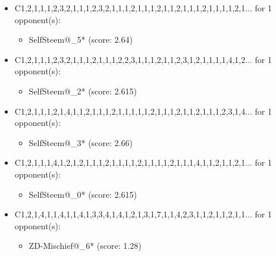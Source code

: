 \begin{appendices}
\begin{itemize}
    \item C1,2,1,1,1,2,3,2,1,1,1,2,3,2,1,1,1,2,1,1,1,2,1,1,2,1,1,1,2,1,1,1,1,2,1... for 1 opponent(s):
    \begin{multicols}{3}
         \begin{itemize}
            \item SelfSteem@\_5* (score: 2.64)
        \end{itemize}
     \end{multicols}
     
    \item C1,2,1,1,1,2,3,2,1,1,1,2,1,1,1,2,2,3,1,1,1,2,1,1,2,3,1,2,1,1,1,1,4,1,2... for 1 opponent(s):
    \begin{multicols}{3}
         \begin{itemize}
            \item SelfSteem@\_2* (score: 2.615)
        \end{itemize}
     \end{multicols}
     
    \item C1,2,1,1,1,2,1,4,1,1,2,1,1,1,2,1,1,1,1,1,2,1,1,1,2,1,1,2,1,1,1,2,3,1,4... for 1 opponent(s):
    \begin{multicols}{3}
         \begin{itemize}
            \item SelfSteem@\_3* (score: 2.66)
        \end{itemize}
     \end{multicols}
     
    \item C1,2,1,1,1,4,1,2,1,2,1,1,1,2,1,1,1,1,2,1,1,1,1,2,1,1,1,4,1,1,2,1,1,2,1... for 1 opponent(s):
    \begin{multicols}{3}
         \begin{itemize}
            \item SelfSteem@\_0* (score: 2.615)
        \end{itemize}
     \end{multicols}
     
    \item C1,2,1,4,1,1,4,1,1,4,1,3,3,4,1,4,1,2,1,3,1,7,1,1,4,2,3,1,1,2,1,1,2,1,1... for 1 opponent(s):
    \begin{multicols}{3}
         \begin{itemize}
            \item ZD-Mischief@\_6* (score: 1.28)
        \end{itemize}
     \end{multicols}
     

\end{itemize}
\end{appendices}
